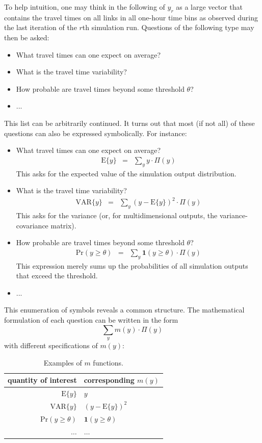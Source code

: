 To help intuition, one may think in the following of $y_{r}$ as a
large vector that contains the travel times on all links in all one-hour
time bins as observed during the last iteration of the $r$th simulation
run. Questions of the following type may then be asked:
\begin{itemize}
\item What travel times can one expect on average?
\item What is the travel time variability?
\item How probable are travel times beyond some threshold $\theta$?
\item ...
\end{itemize}
This list can be arbitrarily continued. It turns out that most (if
not all) of these questions can also be expressed symbolically. For
instance:
\begin{itemize}
\item What travel times can one expect on average?
\begin{eqnarray}
\text{E}\{y\} & = & \sum_{y}y\cdot\Pi(y)\label{eq:question-exp}
\end{eqnarray}
This asks for the expected value of the simulation output distribution.
\item What is the travel time variability?
\begin{eqnarray}
\text{VAR}\{y\} & = & \sum_{y}(y-\text{E}\{y\})^{2}\cdot\Pi(y)\label{eq:question-var}
\end{eqnarray}
This asks for the variance (or, for multidimensional outputs, the
variance-covariance matrix).
\item How probable are travel times beyond some threshold $\theta$?
\begin{eqnarray}
\text{Pr}(y\geq\theta) & = & \sum_{y}\mathbf{1}(y\geq\theta)\cdot\Pi(y)\label{eq:question-proba}
\end{eqnarray}
This expression merely sums up the probabilities of all simulation
outputs that exceed the threshold.
\item ...
\end{itemize}
This enumeration of symbols reveals a common structure. The mathematical
formulation of each question can be written in the form
\begin{equation}
\sum_{y}m(y)\cdot\Pi(y)\label{eq:exp-of-m}
\end{equation}
with different specifications of $m(y)$:

\begin{center}
\begin{table}[H]
\caption{\label{tab:Examples-of-m}Examples of $m$ functions.}


\centering{}%
\begin{tabular}{r|l}
\hline 
quantity of interest & corresponding $m(y)$ \tabularnewline
\hline 
$\text{E}\{y\}$ & $y$\tabularnewline
$\text{VAR}\{y\}$ & $(y-\text{E}\{y\})^{2}$\tabularnewline
$\text{Pr}(y\geq\theta)$ & $\mathbf{1}(y\geq\theta)$\tabularnewline
$\ldots$ & $\ldots$\tabularnewline
\hline 
\end{tabular}
\end{table}

\par\end{center}

